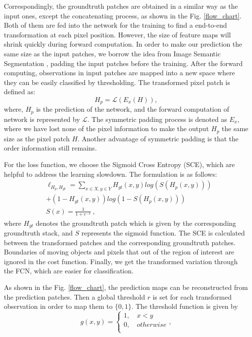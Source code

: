 \documentclass[journal]{IEEEtran}
\newcommand{\reffig}[1]{Fig. \ref{#1}}
\begin{document}
Correspondingly, the groundtruth patches are obtained in a similar way as the input ones, except the concatenating process, as shown in the \reffig{flow_chart}. 
Both of them are fed into the network for the training to find a end-to-end transformation at each pixel position. 
However, the size of feature maps will shrink quickly during forward computation. 
In order to make our prediction the same size as the input patches, we borrow the idea from Image Semantic Segmentation \cite{Shelhamer2017fcn}, padding the input patches before the training. 
After the forward computing, observations in input patches are mapped into a new space where they can be easily classified by thresholding. 
The transformed pixel patch is defined as:
\begin{equation}
H_p= \mathcal L (E_x (H)),
\end{equation}
where, $H_p$ is the prediction of the network, and the forward computation of network is represented by $\mathcal L$. The symmetric padding process is denoted as $E_x$, where we have lost none of the pixel information to make the output $H_p$ the same size as the pixel patch $H$. 
Another advantage of symmetric padding is that the order information still remains.

For the loss function, we choose the Sigmoid Cross Entropy (SCE), which are helpful to address the learning slowdown. 
The formulation is as follows:
\begin{equation}
    \begin{aligned}
        & \ell_{H_p, H_{gt}} =  \sum\limits_{x \in X, y \in Y}^{} H_{gt}(x,y) log(S(H_p(x,y)))  \\
        & + (1 - H_{gt}(x,y)) log(1 - S(H_p(x,y))) \\
        & S(x) =\frac{1}{1+e^{-x}}\  ,
    \end{aligned}
\end{equation}
where $H_{gt}$ denotes the groundtruth patch which is given by the corresponding groundtruth stack, and $S$ represents the sigmoid function. 
The SCE is calculated between the transformed patches and the corresponding groundtruth patches. 
Boundaries of moving objects and pixels that out of the region of interest are ignored in the cost function.
Finally, we get the transformed variation through the FCN, which are easier for classification. 

As shown in the \reffig{flow_chart}, the prediction maps can be reconstructed from the prediction patches.
Then a global threshold $r$ is set for each transformed observation in order to map them to $\{0,1\}$. 
The threshold function is given by
\begin{equation}
    \label{piecewise_fg}
    g(x,y) =
 \begin{cases}
  1,  \quad x < y       \\
  0,  \quad otherwise   \\
\end{cases},
\end{equation}
\end{document}
